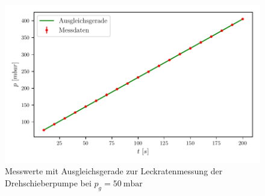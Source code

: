     \begin{figure}[H]
      \centering
      \includegraphics{build/plots/leck_dreh_50.pdf}
      \caption{Messwerte mit Ausgleichsgerade zur Leckratenmessung der Drehschieberpumpe bei $p_g = \SI{50}{\milli\bar}$}
      \label{fig:plotd3}
    \end{figure}

